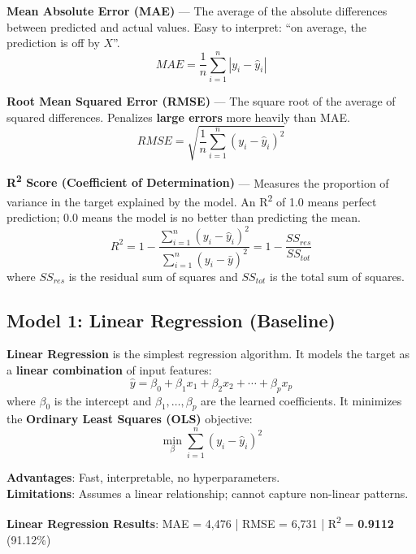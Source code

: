 \documentclass[12pt, a4paper]{article}
\newcommand{\rupee}{\text{₹}}
\begin{document}
\begin{keyterm}
\textbf{Mean Absolute Error (MAE)} — The average of the absolute differences between predicted and actual values. Easy to interpret: ``on average, the prediction is off by \rupee$X$''.
\[
    MAE = \frac{1}{n}\sum_{i=1}^{n}|y_i - \hat{y}_i|
\]
\end{keyterm}

\begin{keyterm}
\textbf{Root Mean Squared Error (RMSE)} — The square root of the average of squared differences. Penalizes \textbf{large errors} more heavily than MAE.
\[
    RMSE = \sqrt{\frac{1}{n}\sum_{i=1}^{n}(y_i - \hat{y}_i)^2}
\]
\end{keyterm}

\begin{keyterm}
\textbf{R\textsuperscript{2} Score (Coefficient of Determination)} — Measures the proportion of variance in the target explained by the model. An R\textsuperscript{2} of 1.0 means perfect prediction; 0.0 means the model is no better than predicting the mean.
\[
    R^2 = 1 - \frac{\sum_{i=1}^{n}(y_i - \hat{y}_i)^2}{\sum_{i=1}^{n}(y_i - \bar{y})^2} = 1 - \frac{SS_{res}}{SS_{tot}}
\]
where $SS_{res}$ is the residual sum of squares and $SS_{tot}$ is the total sum of squares.
\end{keyterm}

\subsection{Model 1: Linear Regression (Baseline)}

\begin{keyterm}
\textbf{Linear Regression} is the simplest regression algorithm. It models the target as a \textbf{linear combination} of input features:
\[
    \hat{y} = \beta_0 + \beta_1 x_1 + \beta_2 x_2 + \cdots + \beta_p x_p
\]
where $\beta_0$ is the intercept and $\beta_1, \ldots, \beta_p$ are the learned coefficients. It minimizes the \textbf{Ordinary Least Squares (OLS)} objective:
\[
    \min_{\beta} \sum_{i=1}^{n}(y_i - \hat{y}_i)^2
\]
\end{keyterm}

\textbf{Advantages}: Fast, interpretable, no hyperparameters. \\
\textbf{Limitations}: Assumes a linear relationship; cannot capture non-linear patterns.

\begin{resultbox}
\textbf{Linear Regression Results}: MAE = \rupee4,476 \quad | \quad RMSE = \rupee6,731 \quad | \quad R\textsuperscript{2} = \textbf{0.9112} (91.12\%)
\end{resultbox}
\end{document}
